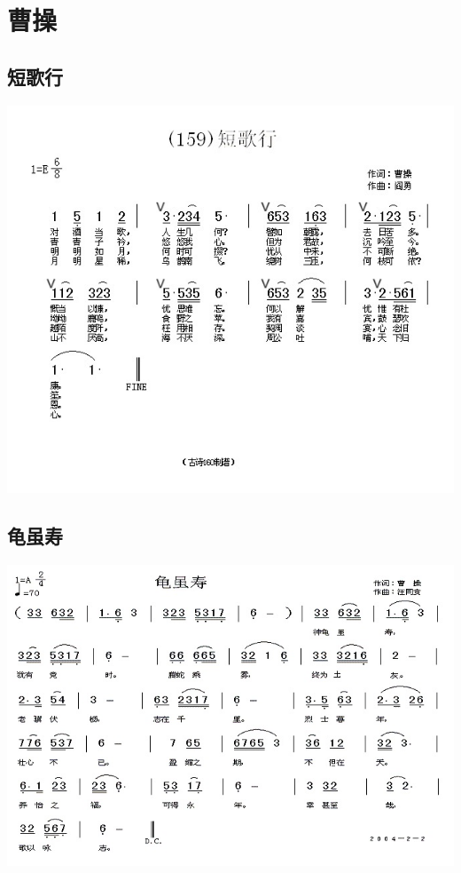 \documentclass[cn,pad,twocol]{elegantbook}
\begin{document}
\chapter{曹操}
\section{短歌行}    \includegraphics[width=\textwidth]{dongxiao/20200808-短歌行-曹操.jpg} 
\section{龟虽寿}    \includegraphics[width=\textwidth]{dongxiao/20200808-神龟虽寿-曹操.jpg}
\end{document}
